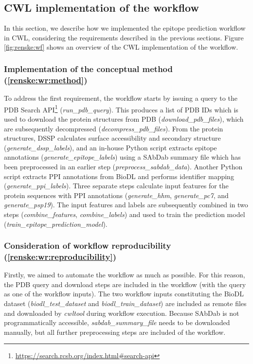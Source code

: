 \subsection{CWL implementation of the workflow}
\label{sec:renske:wf_implementation}

In this section, we describe how we implemented the epitope prediction workflow in CWL, considering the requirements described in the previous sections. Figure \ref{fig:renske:wf} shows an overview of the CWL implementation of the workflow.

\subsubsection{Implementation of the conceptual method (\ref{renske:wr:method})}

To address the first requirement, the workflow starts by issuing a query to the PDB Search API\footnote{\url{https://search.rcsb.org/index.html\#search-api}} (\emph{run\_pdb\_query}). This produces a list of PDB IDs which is used to download the protein structures from PDB (\emph{download\_pdb\_files}), which are subsequently decompressed (\emph{decompress\_pdb\_files}). From the protein structures, DSSP calculates surface accessibility and secondary structure (\emph{generate\_dssp\_labels}), and an in-house Python script extracts epitope annotations (\emph{generate\_epitope\_labels}) using a SAbDab summary file which has been preprocessed in an earlier step (\emph{preprocess\_sabdab\_data}). Another Python script extracts PPI annotations from BioDL and performs identifier mapping (\emph{generate\_ppi\_labels}). Three separate steps calculate input features for the protein sequences with PPI annotations (\emph{generate\_hhm}, \emph{generate\_pc7}, and \emph{generate\_psp19}). The input features and labels are subsequently combined in two steps  (\emph{combine\_features}, \emph{combine\_labels}) and used to train the prediction model (\emph{train\_epitope\_prediction\_model}).

\subsubsection{Consideration of workflow reproducibility  (\ref{renske:wr:reproducibility})} 
Firstly, we aimed to automate the workflow as much as possible. For this reason, the PDB query and download steps are included in the workflow (with the query as one of the workflow inputs). The two workflow inputs constituting the BioDL dataset (\emph{biodl\_test\_dataset} and \emph{biodl\_train\_dataset}) are included as remote files and downloaded by \emph{cwltool} during workflow execution. 
Because SAbDab is not programmatically accessible, \emph{sabdab\_summary\_file} needs to be downloaded manually, but all further preprocessing steps are included of the workflow. 

